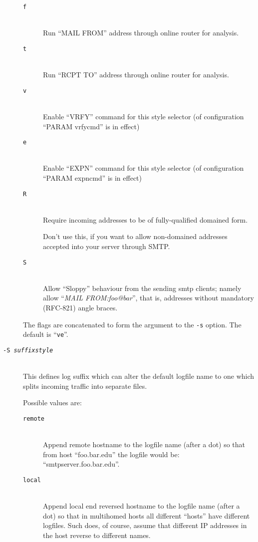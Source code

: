 \begin{description}
\begin{description}
\item[\tt f] \mbox{} \\
Run ``MAIL FROM'' address through online router for analysis.

\item[\tt t] \mbox{} \\
Run ``RCPT TO'' address through online router for analysis.

\item[\tt v] \mbox{} \\
Enable ``VRFY'' command for this style selector
(of configuration ``PARAM vrfycmd'' is in effect)

\item[\tt e] \mbox{} \\
Enable ``EXPN'' command for this style selector
(of configuration ``PARAM expncmd'' is in effect)

\item[\tt R] \mbox{} \\
Require incoming addresses to be of fully-qualified domained form.

Don't use this, if you want to allow non-domained addresses accepted
into your server through SMTP.

\item[\tt S] \mbox{} \\
Allow ``Sloppy'' behaviour from the sending smtp clients; namely
allow ``{\em MAIL FROM:foo@bar}'', that is, addresses without
mandatory (RFC-821) angle braces.
\end{description}

The flags are concatenated to form the argument to the {\tt -s} option. 
The default is ``{\tt ve}''.

\item[\tt -S \em suffixstyle] \mbox{} \\
This defines log suffix which can alter the default logfile
name to one which splits incoming traffic into separate files.

Possible values are:
\begin{description}
\item[\tt remote] \mbox{} \\
Append remote hostname to the logfile name (after a dot) so that
from host ``foo.bar.edu'' the logfile would be:
``smtpserver.foo.bar.edu''.
\item[\tt local] \mbox{} \\
Append local end reversed hostname to the logfile name (after a dot)
so that in multihomed hosts all different ``hosts'' have different logfiles.
Such does, of course, assume that different IP addresses in the host reverse
to different names.
\end{description}


\end{description}
